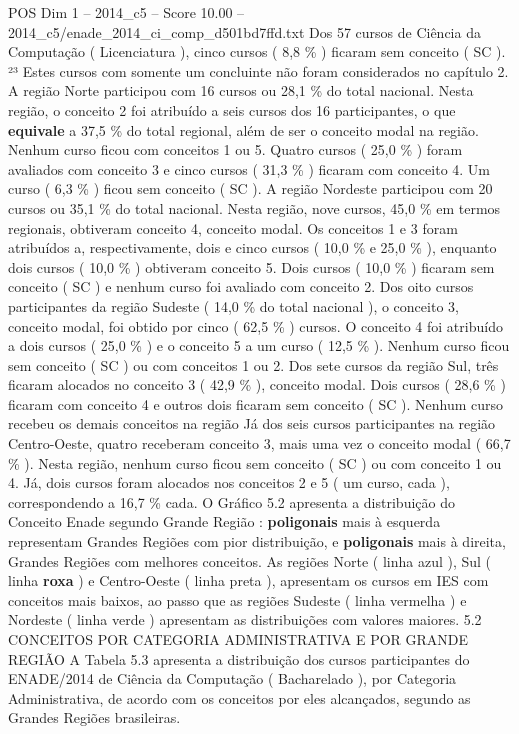 \begin{textsample}{POS Dim 1 – 2014\_c5 – Score 10.00 – 2014\_c5/enade\_2014\_ci\_comp\_d501bd7ffd.txt}
Dos 57 cursos de Ciência da Computação ( Licenciatura ), cinco cursos ( 8,8 \% ) ficaram sem conceito ( SC ). ²³ Estes cursos com somente um concluinte não foram considerados no capítulo 2.
A região Norte participou com 16 cursos ou 28,1 \% do total nacional.
Nesta região, o conceito 2 foi atribuído a seis cursos dos 16 participantes, o que \textbf{equivale} a 37,5 \% do total regional, além de ser o conceito modal na região.
Nenhum curso ficou com conceitos 1 ou 5.
Quatro cursos ( 25,0 \% ) foram avaliados com conceito 3 e cinco cursos ( 31,3 \% ) ficaram com conceito 4.
Um curso ( 6,3 \% ) ficou sem conceito ( SC ).
A região Nordeste participou com 20 cursos ou 35,1 \% do total nacional.
Nesta região, nove cursos, 45,0 \% em termos regionais, obtiveram conceito 4, conceito modal.
Os conceitos 1 e 3 foram atribuídos a, respectivamente, dois e cinco cursos ( 10,0 \% e 25,0 \% ), enquanto dois cursos ( 10,0 \% ) obtiveram conceito 5.
Dois cursos ( 10,0 \% ) ficaram sem conceito ( SC ) e nenhum curso foi avaliado com conceito 2.
Dos oito cursos participantes da região Sudeste ( 14,0 \% do total nacional ), o conceito 3, conceito modal, foi obtido por cinco ( 62,5 \% ) cursos.
O conceito 4 foi atribuído a dois cursos ( 25,0 \% ) e o conceito 5 a um curso ( 12,5 \% ).
Nenhum curso ficou sem conceito ( SC ) ou com conceitos 1 ou 2.
Dos sete cursos da região Sul, três ficaram alocados no conceito 3 ( 42,9 \% ), conceito modal.
Dois cursos ( 28,6 \% ) ficaram com conceito 4 e outros dois ficaram sem conceito ( SC ).
Nenhum curso recebeu os demais conceitos na região Já dos seis cursos participantes na região Centro-Oeste, quatro receberam conceito 3, mais uma vez o conceito modal ( 66,7 \% ).
Nesta região, nenhum curso ficou sem conceito ( SC ) ou com conceito 1 ou 4.
Já, dois cursos foram alocados nos conceitos 2 e 5 ( um curso, cada ), correspondendo a 16,7 \% cada.
O Gráfico 5.2 apresenta a distribuição do Conceito Enade segundo Grande Região : \textbf{poligonais} mais à esquerda representam Grandes Regiões com pior distribuição, e \textbf{poligonais} mais à direita, Grandes Regiões com melhores conceitos.
As regiões Norte ( linha azul ), Sul ( linha \textbf{roxa} ) e Centro-Oeste ( linha preta ), apresentam os cursos em IES com conceitos mais baixos, ao passo que as regiões Sudeste ( linha vermelha ) e Nordeste ( linha verde ) apresentam as distribuições com valores maiores. 5.2 CONCEITOS POR CATEGORIA ADMINISTRATIVA E POR GRANDE REGIÃO A Tabela 5.3 apresenta a distribuição dos cursos participantes do ENADE/2014 de Ciência da Computação ( Bacharelado ), por Categoria Administrativa, de acordo com os conceitos por eles alcançados, segundo as Grandes Regiões brasileiras.

\end{textsample}
